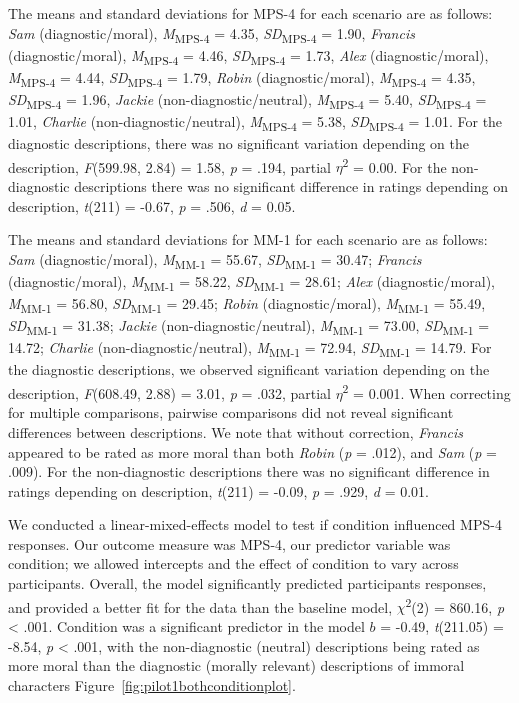 \documentclass[
  american,
  man,floatsintext]{apa7}
\begin{document}
The means and standard deviations for MPS-4 for each scenario are as follows:
\emph{Sam} (diagnostic/moral),
\emph{M}\textsubscript{MPS-4} = 4.35, \emph{SD}\textsubscript{MPS-4} = 1.90,
\emph{Francis} (diagnostic/moral),
\emph{M}\textsubscript{MPS-4} = 4.46, \emph{SD}\textsubscript{MPS-4} = 1.73,
\emph{Alex} (diagnostic/moral),
\emph{M}\textsubscript{MPS-4} = 4.44, \emph{SD}\textsubscript{MPS-4} = 1.79,
\emph{Robin} (diagnostic/moral),
\emph{M}\textsubscript{MPS-4} = 4.35, \emph{SD}\textsubscript{MPS-4} = 1.96,
\emph{Jackie} (non-diagnostic/neutral),
\emph{M}\textsubscript{MPS-4} = 5.40, \emph{SD}\textsubscript{MPS-4} = 1.01,
\emph{Charlie} (non-diagnostic/neutral),
\emph{M}\textsubscript{MPS-4} = 5.38, \emph{SD}\textsubscript{MPS-4} = 1.01. For the diagnostic descriptions, there was no significant variation depending on the description, \emph{F}(599.98, 2.84) = 1.58, \emph{p} = .194, partial \(\eta\)\textsuperscript{2} = 0.00. For the non-diagnostic descriptions there was no significant difference in ratings depending on description, \emph{t}(211) = -0.67, \emph{p} = .506, \emph{d} = 0.05.

The means and standard deviations for MM-1 for each scenario are as follows:
\emph{Sam} (diagnostic/moral),
\emph{M}\textsubscript{MM-1} = 55.67, \emph{SD}\textsubscript{MM-1} = 30.47;
\emph{Francis} (diagnostic/moral),
\emph{M}\textsubscript{MM-1} = 58.22, \emph{SD}\textsubscript{MM-1} = 28.61;
\emph{Alex} (diagnostic/moral),
\emph{M}\textsubscript{MM-1} = 56.80, \emph{SD}\textsubscript{MM-1} = 29.45;
\emph{Robin} (diagnostic/moral),
\emph{M}\textsubscript{MM-1} = 55.49, \emph{SD}\textsubscript{MM-1} = 31.38;
\emph{Jackie} (non-diagnostic/neutral),
\emph{M}\textsubscript{MM-1} = 73.00, \emph{SD}\textsubscript{MM-1} = 14.72;
\emph{Charlie} (non-diagnostic/neutral),
\emph{M}\textsubscript{MM-1} = 72.94, \emph{SD}\textsubscript{MM-1} = 14.79. For the diagnostic descriptions, we observed significant variation depending on the description, \emph{F}(608.49, 2.88) = 3.01, \emph{p} = .032, partial \(\eta\)\textsuperscript{2} = 0.001. When correcting for multiple comparisons, pairwise comparisons did not reveal significant differences between descriptions. We note that without correction, \emph{Francis} appeared to be rated as more moral than both \emph{Robin} (\emph{p} = .012), and \emph{Sam} (\emph{p} = .009). For the non-diagnostic descriptions there was no significant difference in ratings depending on description, \emph{t}(211) = -0.09, \emph{p} = .929, \emph{d} = 0.01.

We conducted a linear-mixed-effects model to test if condition influenced MPS-4 responses. Our outcome measure was MPS-4, our predictor variable was condition; we allowed intercepts and the effect of condition to vary across participants.
Overall, the model significantly predicted participants responses, and provided a better fit for the data than the baseline model, \(\chi\)\textsuperscript{2}(2) = 860.16, \emph{p} \textless{} .001. Condition was a significant predictor in the model \(b\) = -0.49, \emph{t}(211.05) = -8.54, \emph{p} \textless{} .001, with the non-diagnostic (neutral) descriptions being rated as more moral than the diagnostic (morally relevant) descriptions of immoral characters Figure~\ref{fig:pilot1bothconditionplot}.
\end{document}
